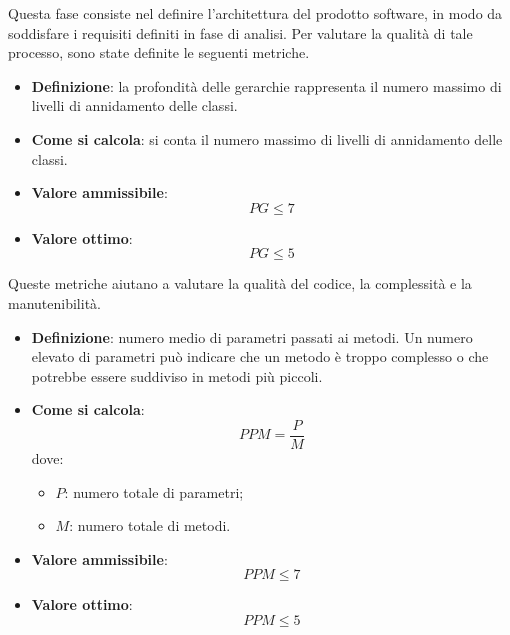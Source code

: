 Questa fase consiste nel definire l'architettura del prodotto software, in modo da soddisfare i requisiti definiti in fase di analisi. Per valutare la qualità di tale processo, sono state definite le seguenti metriche.
\hypertarget{14M}{}
\begin{itemize}
	\item \textbf{Definizione}: la profondità delle gerarchie rappresenta il numero massimo di livelli di annidamento delle classi.
	\item \textbf{Come si calcola}: si conta il numero massimo di livelli di annidamento delle classi.
	\item \textbf{Valore ammissibile}: \begin{equation*}PG \leq 7\end{equation*}
	\item \textbf{Valore ottimo}: \begin{equation*}PG \leq 5\end{equation*}
\end{itemize}

Queste metriche aiutano a valutare la qualità del codice, la complessità e la manutenibilità.

\hypertarget{15M}{}
\begin{itemize}
	\item \textbf{Definizione}: numero medio di parametri passati ai metodi. Un numero elevato di parametri può indicare che un metodo è troppo complesso o che potrebbe essere suddiviso in metodi più piccoli.
	\item \textbf{Come si calcola}: \begin{equation*}PPM = \frac{P}{M}\end{equation*} dove:
		\begin{itemize}
			\item $P$: numero totale di parametri;
			\item $M$: numero totale di metodi.
		\end{itemize}
	\item \textbf{Valore ammissibile}: \begin{equation*}PPM \leq 7\end{equation*}
	\item \textbf{Valore ottimo}: \begin{equation*}PPM \leq 5\end{equation*}
\end{itemize}

